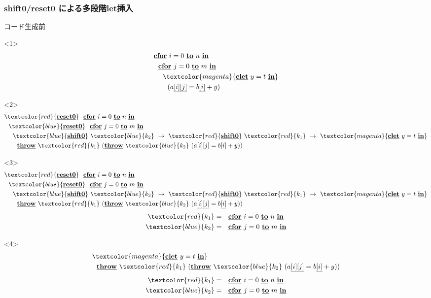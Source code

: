 \documentclass[dvipdfmx,cjk,xcolor=dvipsnames,envcountsect,notheorems,12pt]{beamer}
\newcommand\cResetz{\underline{\textbf{reset0}}}
\newcommand\cShiftz{\underline{\textbf{shift0}}}
\newcommand\cThrow{\underline{\textbf{throw}}}
\newcommand\cLet{\underline{\textbf{clet}}}
\newcommand\cIn{\underline{\textbf{in}}}
\newcommand\red[1]{\textcolor{red}{#1}}
\newcommand\magenta[1]{\textcolor{magenta}{#1}}
\newcommand\blue[1]{\textcolor{blue}{#1}}
\newcommand\cforin[2]{\underline{\textbf{cfor}}~{#1}~\underline{\textbf{to}}~{#2}~\underline{\textbf{in}}}
\newcommand\cArray[1]{\underline{[{#1}]}}
\newcommand\cArrays[2]{\underline{[{#1}][{#2}]}}
\theoremstyle{definition}
\begin{document}
\begin{frame}
  \frametitle{shift0/reset0 による多段階let挿入}
  コード生成前
  \begin{onlyenv}<1>
    \begin{align*}
      & \cforin{i = 0}{n} \\
      & ~~\cforin{j = 0}{m} \\
      & ~~~~\magenta{\cLet~y=t~\cIn} \\
      & ~~~~~~(a\cArrays{i}{j} = b\cArray{i} + y)
    \end{align*}
  \end{onlyenv}

  \begin{onlyenv}<2>
    \begin{align*}
      & \red{\cResetz} ~~\cforin{i = 0}{n} \\
      & ~~\blue{\cResetz} ~~\cforin{j = 0}{m} \\
      & ~~~~\blue{\cShiftz}~\blue{k_2}~\to~ \red{\cShiftz}~\red{k_1}~\to~ \magenta{\cLet~y=t~\cIn} \\
      & ~~~~~~\cThrow~\red{k_1}~(\cThrow~\blue{k_2}~(a\cArrays{i}{j} = b\cArray{i} + y))
    \end{align*}
  \end{onlyenv}

  \begin{onlyenv}<3>
    \begin{align*}
      & \red{\cResetz} ~~\cforin{i = 0}{n} \\
      & ~~\blue{\cResetz} ~~\cforin{j = 0}{m} \\
      & ~~~~\blue{\cShiftz}~\blue{k_2}~\to~ \red{\cShiftz}~\red{k_1}~\to~ \magenta{\cLet~y=t~\cIn} \\
      & ~~~~~~\cThrow~\red{k_1}~(\cThrow~\blue{k_2}~(a\cArrays{i}{j} = b\cArray{i} + y))
    \end{align*}
    \begin{align*}
      \red{k_1} &= ~~\cforin{i = 0}{n} \\
      \blue{k_2} &= ~~\cforin{j = 0}{m} \\
    \end{align*}
  \end{onlyenv}

  \begin{onlyenv}<4>
    \begin{align*}
      & \magenta{\cLet~y=t~\cIn} \\
      & ~~\cThrow~\red{k_1}~(\cThrow~\blue{k_2}~(a\cArrays{i}{j} = b\cArray{i} + y))
    \end{align*}
    \begin{align*}
      \red{k_1} &= ~~\cforin{i = 0}{n} \\
      \blue{k_2} &= ~~\cforin{j = 0}{m} \\
    \end{align*}
  \end{onlyenv}


\end{frame}
\end{document}
